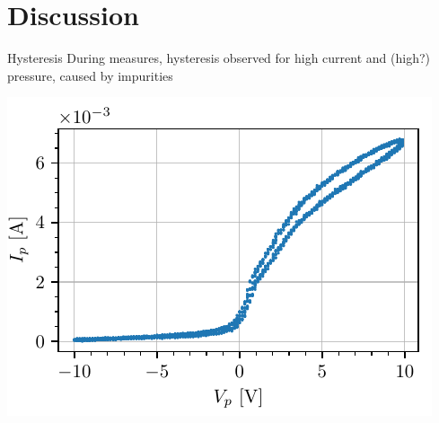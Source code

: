 \documentclass[10pt]{beamer}
\begin{document}
\section{Discussion}
\begin{frame}{Hysteresis}
    During measures,
    hysteresis observed for high current and (high?) pressure, caused by impurities
    \begin{center}
        \includegraphics[scale=1]{../figures/hysteresis.pdf}
    \end{center}

\end{frame}


\end{document}
